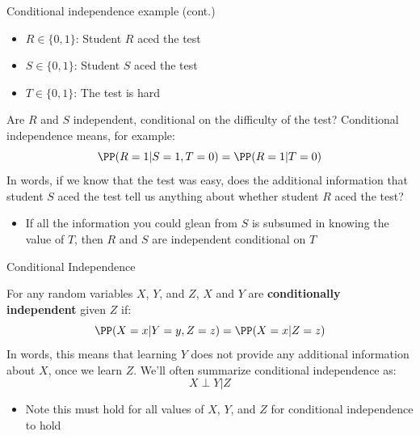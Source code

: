 \documentclass[compress, 8pt]{beamer}
\begin{document}
\begin{frame}{Conditional independence example (cont.)}

\begin{itemize}
    \item $R \in \{0, 1\}$: Student $R$ aced the test
    \item $S \in \{0, 1\}$: Student $S$ aced the test
    \item $T \in \{0, 1\}$: The test is hard
\end{itemize}

\begin{figure}
\end{figure}

Are $R$ and $S$ independent, conditional on the difficulty of the test? Conditional independence means, for example:
\begin{equation*}
    \PP (R = 1\vert S=1, T=0) = \PP (R = 1 \vert T=0)
\end{equation*}
In words, if we know that the test was easy, does the additional information that student $S$ aced the test tell us anything about whether student $R$ aced the test?
\begin{itemize}
    \item If all the information you could glean from $S$ is subsumed in knowing the value of $T$, then $R$ and $S$ are independent conditional on $T$
\end{itemize}

\end{frame}

\begin{frame}{Conditional Independence}


For any random variables $X$, $Y$, and $Z$, $X$ and $Y$ are \textbf{conditionally independent} given $Z$ if:
\begin{equation*}
    \PP (X = x \vert Y = y, Z = z) = \PP (X = x \vert Z = z)
\end{equation*}
In words, this means that learning $Y$ does not provide any additional information about $X$, once we learn $Z$. We'll often summarize conditional independence as:
\begin{equation*}
    X \perp Y \vert Z
\end{equation*}
\begin{itemize}
    \item Note this must hold for all values of $X$, $Y$, and $Z$ for conditional independence to hold
\end{itemize}

\end{frame}
\end{document}
